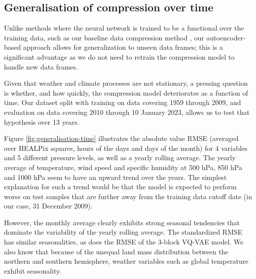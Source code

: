 \subsection{Generalisation of compression over time}
\label{sx:discuss:generalisation}

Unlike methods where the neural network is trained to be a functional over the training data, such as our baseline data compression method \citep{huang2022compressing}, our autoencoder-based approach allows for generalization to unseen data frames; this is a significant advantage as we do not need to retrain the compression model to handle new data frames.

Given that weather and climate processes are not stationary, a pressing question is whether, and how quickly, the compression model deteriorates as a function of time. Our dataset split with training on data covering 1959 through 2009, and evaluation on data covering 2010 through 10 January 2023, allows us to test that hypothesis over 13 years. %

Figure \ref{fig:generalisation-time} illustrates the absolute value RMSE (averaged over HEALPix squares, hours of the days and days of the month) for 4 variables and 5 different pressure levels, as well as a yearly rolling average. The yearly average of temperature, wind speed and specific humidity at 500 hPa, 850 hPa and 1000 hPa seem to have an upward trend over the years. The simplest explanation for such a trend would be that the model is expected to perform worse on test samples that are further away from the training data cutoff date (in our case, 31 December 2009).

However, the monthly average clearly exhibits strong seasonal tendencies that dominate the variability of the yearly rolling average. The standardized RMSE has similar seasonalities, as does the RMSE of the 3-block VQ-VAE model. We also know that because of the unequal land mass distribution between the northern and southern hemisphere, weather variables such as global temperature exhibit seasonality.%

